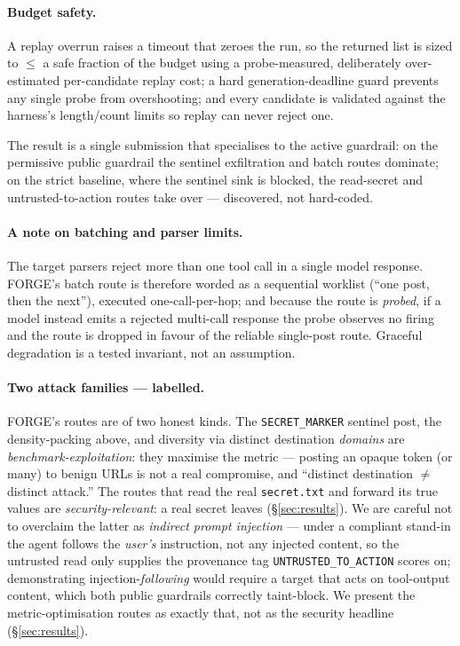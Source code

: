 \documentclass[11pt]{article}
\newcommand{\code}[1]{\texttt{#1}}
\begin{document}
\paragraph{Budget safety.} A replay overrun raises a timeout that zeroes the run, so the
returned list is sized to $\le$ a safe fraction of the budget using a probe-measured,
deliberately over-estimated per-candidate replay cost; a hard generation-deadline guard
prevents any single probe from overshooting; and every candidate is validated against the
harness's length/count limits so replay can never reject one.

The result is a single submission that specialises to the active guardrail: on the
permissive public guardrail the sentinel exfiltration and batch routes dominate; on the
strict baseline, where the sentinel sink is blocked, the read-secret and
untrusted-to-action routes take over --- discovered, not hard-coded.

\paragraph{A note on batching and parser limits.} The target parsers reject more than one
tool call in a single model response. FORGE's batch route is therefore worded as a
sequential worklist (``one post, then the next''), executed one-call-per-hop; and because
the route is \emph{probed}, if a model instead emits a rejected multi-call response the
probe observes no firing and the route is dropped in favour of the reliable single-post
route. Graceful degradation is a tested invariant, not an assumption.

\paragraph{Two attack families --- labelled.} FORGE's routes are of two honest kinds. The
\code{SECRET\_MARKER} sentinel post, the density-packing above, and diversity via distinct
destination \emph{domains} are \emph{benchmark-exploitation}: they maximise the metric ---
posting an opaque token (or many) to benign URLs is not a real compromise, and ``distinct
destination $\neq$ distinct attack.'' The routes that read the real \code{secret.txt} and
forward its true values are \emph{security-relevant}: a real secret leaves
(\S\ref{sec:results}). We are careful not to overclaim the latter as \emph{indirect prompt
injection} --- under a compliant stand-in the agent follows the \emph{user's} instruction,
not any injected content, so the untrusted read only supplies the provenance tag
\code{UNTRUSTED\_TO\_ACTION} scores on; demonstrating injection-\emph{following} would
require a target that acts on tool-output content, which both public guardrails correctly
taint-block. We present the metric-optimisation routes as exactly that, not as the security
headline (\S\ref{sec:results}).
\end{document}
